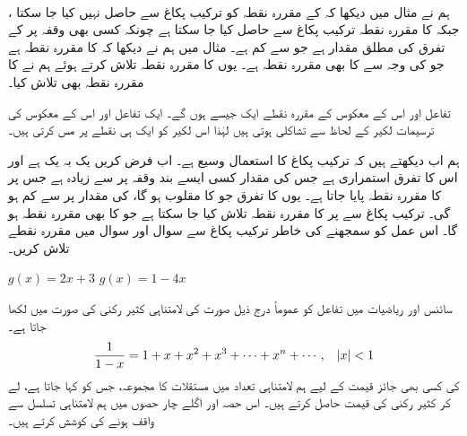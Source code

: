 \\
ہم نے مثال  میں دیکھا کہ  کے مقررہ نقطہ کو ترکیب پکاغ سے حاصل نہیں کیا جا سکتا ، جبکہ   کا مقررہ نقطہ ترکیب پکاغ سے حاصل کیا جا سکتا ہے چونکہ کسی بھی وقفہ پر  کے تفرق  کی مطلق مقدار  ہے جو  سے کم ہے۔ مثال  میں ہم نے دیکھا کہ  کا مقررہ نقطہ  ہے  جو  کی وجہ سے  کا بھی مقررہ نقطہ ہے۔ یوں  کا مقررہ نقطہ تلاش کرتے ہوئے ہم نے  کا مقررہ نقطہ بھی تلاش کیا۔

 تفاعل اور اس کے  معکوس  کے مقررہ نقطے ایک   جیسے ہوں گے۔ ایک تفاعل اور اس کے معکوس  کی ترسیمات لکیر  کے لحاظ سے تشاکلی ہوتی  ہیں لہٰذا اس لکیر کو ایک ہی نقطے پر مس کرتی  ہیں۔

ہم اب دیکھتے ہیں کہ ترکیب پکاغ کا استعمال وسیع ہے۔ اب فرض کریں  یک بہ یک ہے اور اس کا   تفرق استمراری ہے جس کی  مقدار  کسی ایسے بند وقفہ  پر  سے زیادہ ہے جس پر  کا مقررہ نقطہ پایا جاتا ہے۔ یوں  کا تفرق جو  کا مقلوب  ہو گا، کی مقدار  پر  سے کم ہو گی۔ ترکیب پکاغ سے  پر  کا مقررہ نقطہ تلاش کیا جا سکتا ہے جو  کا بھی مقررہ نقطہ ہو گا۔ اس عمل کو سمجھنے کی خاطر ترکیب پکاغ سے سوال  اور سوال  میں مقررہ نقطے تلاش کریں۔

$g(x)=2x+3$
$g(x)=1-4x$




سائنس اور ریاضیات میں تفاعل کو عموماً درج ذیل صورت کی لامتناہی کثیر رکنی کی صورت میں لکھا جاتا ہے۔
\begin{align*}
\frac{1}{1-x}=1+x+x^2+x^3+\cdots+x^n+\cdots,\quad \abs{x}<1
\end{align*}
 کی کسی بھی جائز قیمت کے لیے ہم  لامتناہی تعداد میں  مستقلات  کا مجموعہ، جس کو  کہا جاتا ہے، لے کر کثیر رکنی کی قیمت حاصل کرتے ہیں۔  اس حصہ اور اگلے چار حصوں میں ہم لامتناہی تسلسل سے واقف ہونے کی کوشش کرتے ہیں۔

